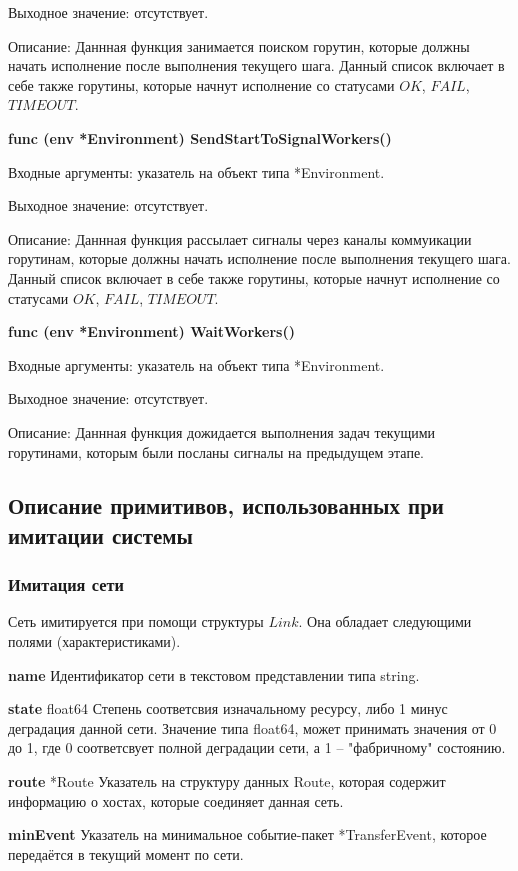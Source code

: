 Выходное значение: отсутствует. 

Описание: Даннная функция занимается поиском горутин, которые должны начать исполнение после выполнения текущего шага. Данный список включает в себе также горутины, которые начнут исполнение со статусами $OK$, $FAIL$, $TIMEOUT$.

\textbf{func (env *Environment) SendStartToSignalWorkers()}

Входные аргументы: указатель на объект типа *Environment.

Выходное значение: отсутствует. 

Описание: Даннная функция рассылает сигналы через каналы коммуикации горутинам, которые должны начать исполнение после выполнения текущего шага. Данный список включает в себе также горутины, которые начнут исполнение со статусами $OK$, $FAIL$, $TIMEOUT$.

\textbf{func (env *Environment) WaitWorkers() }

Входные аргументы: указатель на объект типа *Environment.

Выходное значение: отсутствует. 

Описание: Даннная функция дожидается выполнения задач текущими горутинами, которым были посланы сигналы на предыдущем этапе.



\subsection{Описание примитивов, использованных при имитации системы}

\subsubsection{Имитация сети}

Сеть имитируется при помощи структуры $Link$. Она обладает следующими полями (характеристиками). 

\textbf{name}
Идентификатор сети в текстовом представлении типа string. 

\textbf{state}	 float64
Степень соответсвия изначальному ресурсу, либо 1 минус деградация данной сети. Значение типа float64, может принимать значения от 0 до 1, где 0 соответсвует полной деградации сети, а 1 -- "фабричному" состоянию. 

\textbf{route}	 *Route
Указатель на структуру данных Route, которая содержит информацию о хостах, которые соединяет данная сеть. 

\textbf{minEvent}	
Указатель на минимальное событие-пакет *TransferEvent, которое передаётся в текущий момент по сети. 

